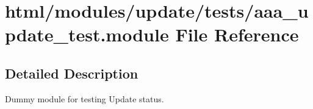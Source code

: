 \hypertarget{aaa__update__test_8module}{
\section{html/modules/update/tests/aaa\_\-update\_\-test.module File Reference}
\label{aaa__update__test_8module}
}


\subsection{Detailed Description}
Dummy module for testing Update status. 